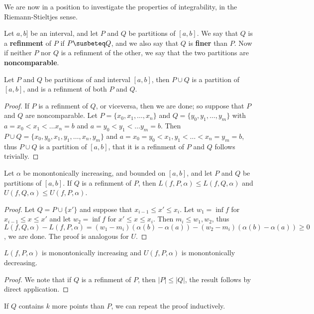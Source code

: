 We are now in a position to investigate the properties of integrability, in the
Riemann-Stieltjes sense.

\begin{definition}
    Let $a,b]$ be an interval, and let  $P$ and  $Q$ be partitions of  $[a,b]$.
    We say that  $Q$ is a \textbf{refinment} of $P$ if  $P \susbeteq Q$, and we
    also say that $Q$ is \textbf{finer} than  $P$. Now if neither  $P$ nor  $Q$
    is a refinment of the other, we say that the two partitions are
    \textbf{noncomparable}.
\end{definition}

\begin{lemma}\label{7.1.2}
    Let $P$ and  $Q$ be partitions of and interval $[a,b]$, then  $P \cup Q$ is
    a partition of  $[a,b]$, and is a refinment of both  $P$ and  $Q$.
\end{lemma}
\begin{proof}
    If $P$ is a refinment of  $Q$, or viceversa, then we are done; so suppose
    that  $P$ and  $Q$ are noncomparable. Let  $P=\{x_0,x_1, \dots, x_n\}$ and
    $Q=\{y_0,y_1, \dots, y_m\}$ with $a=x_0<x_1< \dots x_n=b$ and $a=y_0<y_1<
    \dots y_m=b$. Then $P \cup Q=\{x_0,y_0,x_1,y_1, \dots, x_n,y_m\}$ and
    $a=x_0=y_0 < x_1,y_1 < \dots <x_n=y_m=b$, thus $P \cup Q$ is a partition of
    $[a,b]$, that it is a refinment of  $P$ and  $Q$ follows trivially.
\end{proof}

\begin{theorem}\label{7.1.3}
    Let $\alpha$ be monontonically increasing, and bounded on  $[a,b]$, and let
    $P$ and  $Q$ be partitions of  $[a,b]$. If  $Q$ is a refinment of  $P$, then
    $L(f,P,\alpha) \leq L(f,Q,\alpha)$ and  $U(f,Q,\alpha) \leq U(f,P,\alpha)$.
\end{theorem}
\begin{proof}
    Let $Q=P \cup \{x'\}$ and suppose that  $x_{i-1} \leq x' \leq x_i$.  Let 
    $w_1=\inf{f}$ for $x_{i-1} \leq x \leq x'$ and let $w_2=\inf{f}$ for $x'
    \leq x \leq x_i$. Then $m_i \leq w_1,w_2$, thus
    $L(f,Q,\alpha)-L(f,P,\alpha)=(w_1-m_i)(\alpha(b)-\alpha(a))-(w_2-m_i)(\alpha(b)-\alpha(a))
    \geq 0$, we are done. The proof is analogous for $U$.
\end{proof}
\begin{corollary}
    $L(f,P,\alpha)$ is monontonically increasing and  $U(f,P,\alpha)$ is
    monontonically decreasing.		
\end{corollary}
\begin{proof}
    We note that if $Q$ is a refinment of  $P$, then  $|P| \leq |Q|$, the result
    follows by direct application.
\end{proof}
\begin{remark}
    If $Q$ contains  $k$ more points than  $P$, we can repeat the proof
    inductively.
\end{remark}

